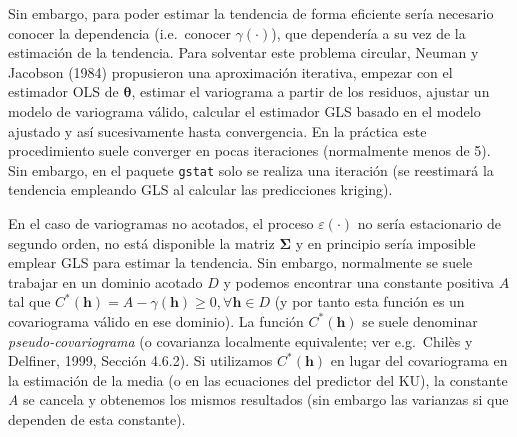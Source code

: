 \documentclass[
  spanish,
]{book}
\theoremstyle{break}
\theoremstyle{definition}
\theoremstyle{definition}
\theoremstyle{definition}
\theoremstyle{definition}
\theoremstyle{remark}
\begin{document}
Sin embargo, para poder estimar la tendencia de forma eficiente sería necesario conocer la dependencia (i.e.~conocer \(\gamma(\cdot)\)), que dependería a su vez de la estimación de la tendencia.
Para solventar este problema circular, Neuman y Jacobson (1984) propusieron una aproximación iterativa, empezar con el estimador OLS de \(\boldsymbol{\theta}\), estimar el variograma a partir de los residuos, ajustar un modelo de variograma válido, calcular el estimador GLS basado en el modelo ajustado y así sucesivamente hasta convergencia.
En la práctica este procedimiento suele converger en pocas iteraciones (normalmente menos de 5).
Sin embargo, en el paquete \texttt{gstat} solo se realiza una iteración (se reestimará la tendencia empleando GLS al calcular las predicciones kriging).

En el caso de variogramas no acotados, el proceso \(\varepsilon(\cdot)\) no sería estacionario de segundo orden, no está disponible la matriz \(\boldsymbol{\Sigma}\) y en principio sería imposible emplear GLS para estimar la tendencia.
Sin embargo, normalmente se suele trabajar en un dominio acotado \(D\) y podemos encontrar una constante positiva \(A\) tal que \(C^{\ast }(\mathbf{h})= A-\gamma(\mathbf{h})\geq 0,\forall \mathbf{h}\in D\) (y por tanto esta función es un covariograma válido en ese dominio).
La función \(C^{\ast }(\mathbf{h})\) se suele denominar \emph{pseudo-covariograma} (o covarianza localmente equivalente; ver e.g.~Chilès y Delfiner, 1999, Sección 4.6.2).
Si utilizamos \(C^{\ast }(\mathbf{h})\) en lugar del covariograma en la estimación de la media (o en las ecuaciones del predictor del KU), la constante \emph{A} se cancela y obtenemos los mismos resultados (sin embargo las varianzas si que dependen de esta constante).
\end{document}
